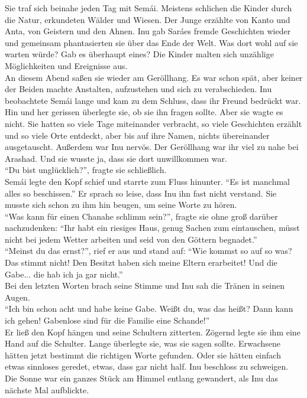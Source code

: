 Sie traf sich beinahe jeden Tag mit Semái. Meistens schlichen die Kinder durch die Natur, 
erkundeten Wälder und Wiesen. Der Junge erzählte von Kanto und Anta, von Geistern und den Ahnen. 
Inu gab Saráes fremde Geschichten wieder und gemeinsam phantasierten sie über das Ende der Welt. 
Was dort wohl auf sie warten würde? Gab es überhaupt eines? Die Kinder malten sich unzählige 
Möglichkeiten und Ereignisse aus. \\
An diesem Abend saßen sie wieder am Geröllhang. Es war schon spät, aber keiner der Beiden machte 
Anstalten, aufzustehen und sich zu verabschieden. Inu beobachtete Semái lange und kam zu dem 
Schluss, dass ihr Freund bedrückt war. Hin und her gerissen überlegte sie, ob sie ihn fragen 
sollte. Aber sie wagte es nicht. Sie hatten so viele Tage miteinander verbracht, so viele 
Geschichten erzählt und so viele Orte entdeckt, aber bis auf ihre Namen, nichts übereinander 
ausgetauscht. Außerdem war Inu nervös. Der Geröllhang war ihr viel zu nahe bei Arashad. Und sie 
wusste ja, dass sie dort unwillkommen war. \\
``Du bist unglücklich?'', fragte sie schließlich.\\
Semái legte den Kopf schief und starrte zum Fluss hinunter. ``Es ist manchmal alles so beschissen.''
Er sprach so leise, dass Inu ihn fast nicht verstand. Sie musste sich schon zu ihm hin beugen, um 
seine Worte zu hören. \\
``Was kann für einen Chanahe schlimm sein?'', fragte sie ohne groß darüber nachzudenken: ``Ihr habt 
ein riesiges Haus, genug Sachen zum eintauschen, müsst nicht bei jedem Wetter arbeiten und seid von 
den Göttern begnadet.''\\
``Meinst du das ernst?'', rief er aus und stand auf: ``Wie kommst so auf so was? Das stimmt nicht! 
Den Besitzt haben sich meine Eltern erarbeitet! Und die Gabe... die hab ich ja gar nicht.''\\
Bei den letzten Worten brach seine Stimme und Inu sah die Tränen in seinen Augen. \\
``Ich bin schon acht und habe keine Gabe. Weißt du, was das heißt? Dann kann ich gehen! Gabenlose 
sind für die Familie eine Schande!''\\
Er ließ den Kopf hängen und seine Schultern zitterten. Zögernd legte sie ihm eine Hand auf die 
Schulter. Lange überlegte sie, was sie sagen sollte. Erwachsene hätten jetzt bestimmt die richtigen 
Worte gefunden. Oder sie hätten einfach etwas sinnloses geredet, etwas, dass gar nicht half. Inu 
beschloss zu schweigen. 
Die Sonne war ein ganzes Stück am Himmel entlang gewandert, als Inu das nächste Mal aufblickte.\\
